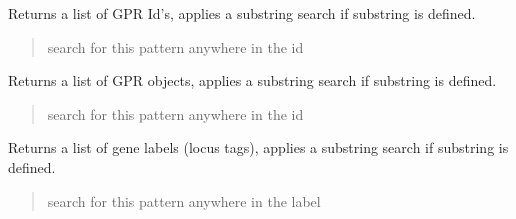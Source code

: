 \documentclass[letterpaper,12pt,english]{sphinxmanual}
\begin{document}
\begin{fulllineitems}

\begin{fulllineitems}
\label{\detokenize{api/core:cbmpy.CBModel.Model.getGPRIds}}
\pysigstartsignatures
\pysiglinewithargsret
{}
{}
{}
\pysigstopsignatures
\sphinxAtStartPar
Returns a list of GPR Id’s, applies a substring search if substring is defined.
\begin{quote}\begin{description}
\sphinxAtStartPar
{} \textendash{} search for this pattern anywhere in the id

\end{description}\end{quote}

\end{fulllineitems}


\begin{fulllineitems}
\label{\detokenize{api/core:cbmpy.CBModel.Model.getGPRObjects}}
\pysigstartsignatures
\pysiglinewithargsret
{}
{}
{}
\pysigstopsignatures
\sphinxAtStartPar
Returns a list of GPR objects, applies a substring search if substring is defined.
\begin{quote}\begin{description}
\sphinxAtStartPar
{} \textendash{} search for this pattern anywhere in the id

\end{description}\end{quote}

\end{fulllineitems}


\begin{fulllineitems}
\label{\detokenize{api/core:cbmpy.CBModel.Model.getGeneLabels}}
\pysigstartsignatures
\pysiglinewithargsret
{}
{}
{}
\pysigstopsignatures
\sphinxAtStartPar
Returns a list of gene labels (locus tags), applies a substring search if substring is defined.
\begin{quote}\begin{description}
\sphinxAtStartPar
{} \textendash{} search for this pattern anywhere in the label


\end{description}
\end{quote}
\end{fulllineitems}
\end{fulllineitems}
\end{document}
